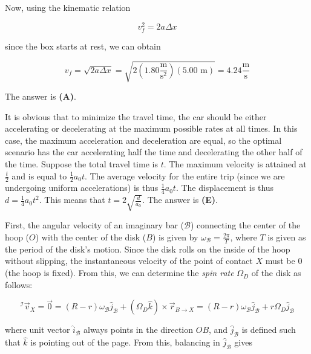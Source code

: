 \documentclass[12pt]{article}
\begin{document}
Now, using the kinematic relation

$$v_f^2 = 2 a \Delta x$$

since the box starts at rest, we can obtain

$$v_f = \sqrt{2 a \Delta x} = \sqrt{2 \left( 1.80 \frac{\text{m}}{\text{s}^2} \right) (5.00 \text{ m})} = 4.24 \frac{\text{m}}{\text{s}}$$

The answer is \textbf{(A)}.


\vspace{2 \baselineskip}



It is obvious that to minimize the travel time, the car should be either accelerating or decelerating at the maximum possible rates at all times. In this case, the maximum acceleration and deceleration are equal, so the optimal scenario has the car accelerating half the time and decelerating the other half of the time. Suppose the total travel time is $t$. The maximum velocity is attained at $\frac{t}{2}$ and is equal to $\frac{1}{2} a_0 t$. The average velocity for the entire trip (since we are undergoing uniform accelerations) is thus $\frac{1}{4} a_0 t$. The displacement is thus $d = \frac{1}{4} a_0 t^2$. This means that $t = 2 \sqrt{\frac{d}{a_0}}$. The answer is \textbf{(E)}.


\vspace{2 \baselineskip}



First, the angular velocity of an imaginary bar ($\mathcal{B}$) connecting the center of the hoop ($O$) with the center of the disk ($B$) is given by $\omega_\mathcal{B} = \frac{2 \pi}{T}$, where $T$ is given as the period of the disk's motion. Since the disk rolls on the inside of the hoop without slipping, the instantaneous velocity of the point of contact $X$ must be $0$ (the hoop is fixed). From this, we can determine the \textit{spin rate} $\Omega_D$ of the disk as follows:

$$^\mathcal{I} \vec{v}_X = \vec{0} = (R - r) \omega_\mathcal{B} \hat{j}_\mathcal{B} + (\Omega_D \hat{k}) \times \vec{r}_{B \to X} = (R - r) \omega_\mathcal{B} \hat{j}_\mathcal{B} + r \Omega _D \hat{j}_\mathcal{B}$$

where unit vector $\hat{i}_\mathcal{B}$ always points in the direction $OB$, and $\hat{j}_\mathcal{B}$ is defined such that $\hat{k}$ is pointing out of the page. From this, balancing in $\hat{j}_\mathcal{B}$ gives
\end{document}

